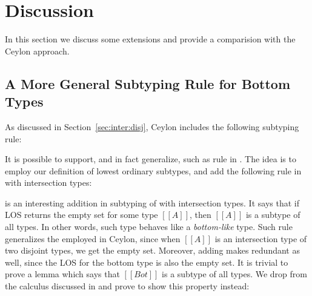 \section{Discussion}
\label{sec:discussion}
In this section we discuss some extensions and provide a comparision with the Ceylon approach.

\subsection{A More General Subtyping Rule for Bottom  Types}
\label{sec:inter:refactoring}
As discussed in Section~\ref{sec:inter:disj}, Ceylon includes the following subtyping rule:

\begin{center}
\end{center}

\noindent It is possible to support, and in fact generalize, such as rule in \name. The idea is to
employ our definition of lowest ordinary subtypes, and add the following rule
in \cal with intersection types:

\begin{center}
\end{center}

\noindent {} is an interesting addition in subtyping of \cal with intersection types.
It says that if LOS returns the empty set for some type $[[A]]$, then $[[A]]$
is a subtype of all types. In other words, such type behaves like a \emph{bottom-like} type.
Such rule generalizes the 
employed in Ceylon, since when $[[A]]$ is an intersection type of two
disjoint types, we get the empty set.
Moreover, adding  makes  redundant as well, since the LOS for
the bottom type is also the empty set. It is trivial to prove a lemma which says that $[[Bot]]$ is a subtype of all types. We drop  from the calculus discussed in 
and prove  to show this property instead:


